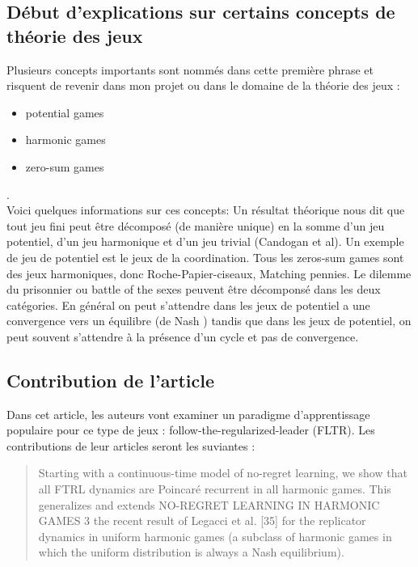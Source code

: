 \documentclass{article}
\begin{document}
 \subsection{Début d'explications sur certains concepts de théorie des jeux}
Plusieurs concepts importants sont nommés dans cette première phrase et risquent de revenir dans mon projet ou dans le domaine de la théorie des jeux : \begin{itemize}
    \item potential games
    \item harmonic games
    \item zero-sum games
\end{itemize}.\\ Voici quelques informations sur ces concepts: Un résultat théorique nous dit que tout jeu fini peut être décomposé (de manière unique) en la somme d’un jeu potentiel, d’un jeu harmonique et d’un jeu trivial (Candogan et al). 
Un exemple de jeu de potentiel est le jeux de la coordination. Tous les zeros-sum games sont des jeux harmoniques, donc Roche-Papier-ciseaux,  Matching pennies.
Le dilemme du prisonnier ou battle of the sexes peuvent être décomponsé dans les deux catégories. En général on peut s'attendre dans les jeux de potentiel a une convergence vers un équilibre (de Nash ) tandis que dans les jeux de potentiel, on peut souvent s'attendre à la présence d'un cycle et pas de convergence. 

\subsection{Contribution de l'article}
Dans cet article, les auteurs vont examiner un paradigme d'apprentissage populaire pour ce type de jeux : follow-the-regularized-leader (FLTR). Les contributions de leur articles seront les suviantes : 
\begin{quote}
Starting with a continuous-time model of no-regret learning, we show that all FTRL
dynamics are Poincaré recurrent in all harmonic games. This generalizes and extends
NO-REGRET LEARNING IN HARMONIC GAMES 3
the recent result of Legacci et al. [35] for the replicator dynamics in uniform harmonic
games (a subclass of harmonic games in which the uniform distribution is always a
Nash equilibrium).
\end{quote}
\end{document}
